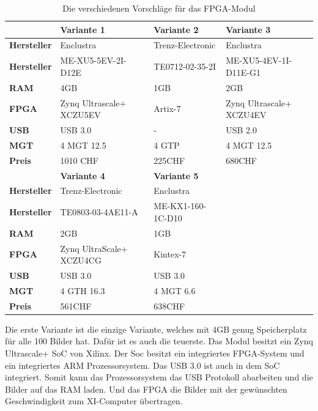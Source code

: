 \documentclass{article}
\begin{document}
\begin{table}[tb]
    \caption{Die verschiedenen Vorschläge für das FPGA-Modul}
    \begin{tabular}{|l|l|l|l|}
        \hline
        & \textbf{Variante 1} & \textbf{Variante 2} & \textbf{Variante 3} \\ \hline

        \textbf{Hersteller} & Enclustra & Trenz-Electronic & Enclustra \\ \hline
        \textbf{Hersteller} & ME-XU5-5EV-2I-D12E & TE0712-02-35-2I & ME-XU5-4EV-1I-D11E-G1 \\ \hline
        \textbf{RAM} & 4GB & 1GB & 2GB \\ \hline
        \textbf{FPGA} & Zynq Ultrascale+ XCZU5EV & Artix-7 & Zynq Ultrascale+ XCZU4EV \\ \hline
        \textbf{USB} & USB 3.0 & - & USB 2.0 \\ \hline
        \textbf{MGT} & 4 MGT 12.5 & 4 GTP & 4 MGT 12.5  \\ \hline
        \textbf{Preis} & 1010 CHF & 225CHF & 680CHF \\ \hline

        \hline
        & \textbf{Variante 4} & \textbf{Variante 5} & \\ \hline
        \textbf{Hersteller} & Trenz-Electronic & Enclustra & \\ \hline
        \textbf{Hersteller} & TE0803-03-4AE11-A & ME-KX1-160-1C-D10 & \\ \hline
        \textbf{RAM} & 2GB & 1GB & \\ \hline
        \textbf{FPGA} & Zynq UltraScale+ XCZU4CG & Kintex-7 & \\ \hline
        \textbf{USB} & USB 3.0 & USB 3.0 & \\ \hline
        \textbf{MGT} & 4 GTH 16.3 & 4 MGT 6.6 & \\ \hline
        \textbf{Preis} & 561CHF & 638CHF & \\ \hline
    \end{tabular}

        
    \label{tab:modulVarianten}
    \end{table}

    Die erste Variante ist die einzige Variante, welches mit 4GB genug Speicherplatz für alle 100 Bilder hat. Dafür ist es auch die teuerste. Das Modul besitzt ein Zynq Ultrascale+ SoC von Xilinx. Der Soc besitzt ein integriertes FPGA-System und ein integriertes ARM Prozessorsystem. Das USB 3.0 ist auch in dem SoC integriert. Somit kann das Prozessorsystem das USB Protokoll abarbeiten und die Bilder auf das RAM laden. Und das FPGA die Bilder mit der gewünschten Geschwindigkeit zum XI-Computer übertragen.
    
\end{document}
